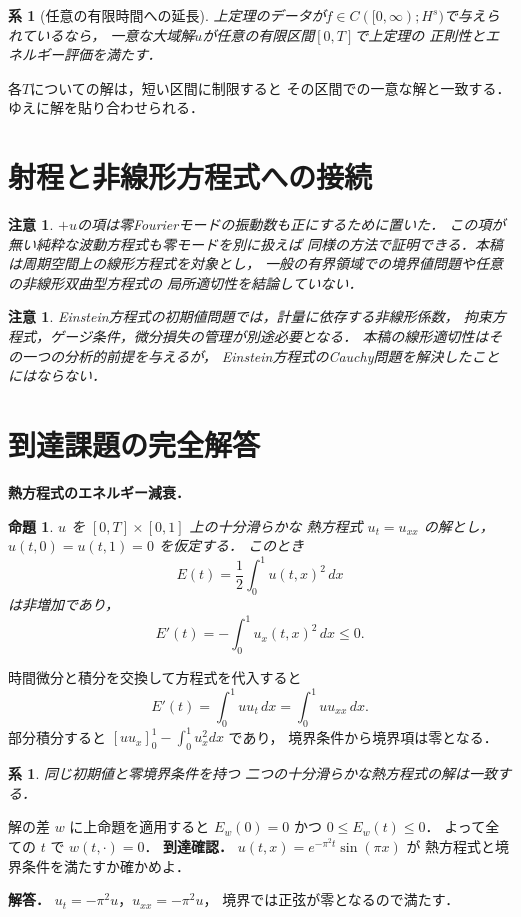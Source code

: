 \documentclass[a5paper,10pt,onecolumn]{jsarticle}
\makeatletter
\theoremstyle{mathnotetheorem}
\newtheorem{proposition}[theorem]{命題}
\newtheorem{corollary}[theorem]{系}
\newtheorem{remark}[theorem]{注意}
\renewcommand{\proofname}{証明}
\renewenvironment{proof}[1][\proofname]{%
  \par\pushQED{\qed}\normalfont\topsep4\p@\@plus2\p@\relax
  \trivlist\item[\hskip\labelsep\bfseries #1]\ignorespaces
}{\popQED\endtrivlist\@endpefalse}
\makeatother
\begin{document}
\begin{corollary}[任意の有限時間への延長]
上定理のデータが$f\in C([0,\infty);H^s)$で与えられているなら，
一意な大域解$u$が任意の有限区間$[0,T]$で上定理の
正則性とエネルギー評価を満たす．
\end{corollary}
\begin{proof}
各$T$についての解は，短い区間に制限すると
その区間での一意な解と一致する．ゆえに解を貼り合わせられる．
\end{proof}

\section{射程と非線形方程式への接続}
\begin{remark}
$+u$の項は零Fourierモードの振動数も正にするために置いた．
この項が無い純粋な波動方程式も零モードを別に扱えば
同様の方法で証明できる．本稿は周期空間上の線形方程式を対象とし，
一般の有界領域での境界値問題や任意の非線形双曲型方程式の
局所適切性を結論していない．
\end{remark}
\begin{remark}
Einstein方程式の初期値問題では，計量に依存する非線形係数，
拘束方程式，ゲージ条件，微分損失の管理が別途必要となる．
本稿の線形適切性はその一つの分析的前提を与えるが，
Einstein方程式のCauchy問題を解決したことにはならない．
\end{remark}




\section{到達課題の完全解答}
\noindent\textbf{熱方程式のエネルギー減衰．}
\begin{proposition}
$u$ を $[0,T]\times[0,1]$ 上の十分滑らかな
熱方程式
$u_t=u_{xx}$ の解とし，
$u(t,0)=u(t,1)=0$ を仮定する．
このとき
\[
E(t)=\frac12\int_0^1u(t,x)^2\,dx
\]
は非増加であり，
\[
E'(t)=-\int_0^1u_x(t,x)^2\,dx\le0.
\]
\end{proposition}
\begin{proof}
時間微分と積分を交換して方程式を代入すると
\[
E'(t)=\int_0^1uu_t\,dx
=\int_0^1uu_{xx}\,dx.
\]
部分積分すると
$[uu_x]_0^1-\int_0^1u_x^2dx$ であり，
境界条件から境界項は零となる．
\end{proof}
\begin{corollary}
同じ初期値と零境界条件を持つ
二つの十分滑らかな熱方程式の解は一致する．
\end{corollary}
\begin{proof}
解の差 $w$ に上命題を適用すると
$E_w(0)=0$ かつ $0\le E_w(t)\le0$．
よって全ての $t$ で $w(t,\cdot)=0$．
\end{proof}
\noindent\textbf{到達確認．}
$u(t,x)=e^{-\pi^2t}\sin(\pi x)$ が
熱方程式と境界条件を満たすか確かめよ．
\par\noindent\textbf{解答．}
$u_t=-\pi^2u$，$u_{xx}=-\pi^2u$，
境界では正弦が零となるので満たす．
\end{document}

